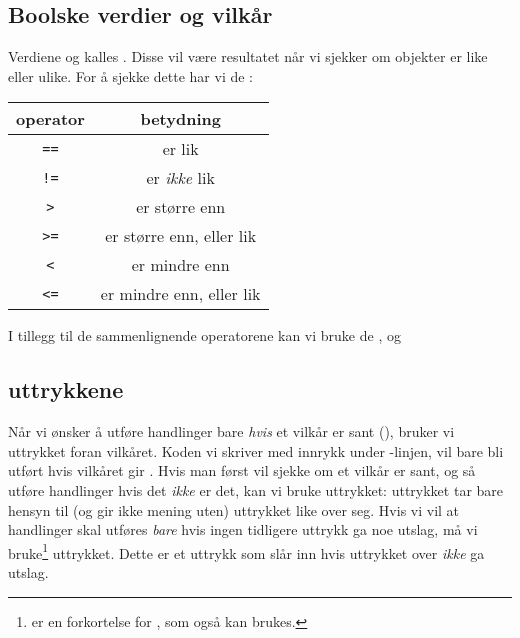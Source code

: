 \subsection{Boolske verdier og vilkår}
Verdiene  og  kalles . Disse vil være resultatet når vi sjekker om objekter er like eller ulike. For å sjekke dette har vi de :
\begin{center}
	\begin{tabular}{c|c}
		\textbf{operator} & \textbf{betydning} \\ \hline
		\texttt{==}	& er lik \\ \rowcolor{gray!10}
		\texttt{!=} & er \textsl{ikke} lik\\
		\texttt{>} & er større enn \\ \rowcolor{gray!10}
		\texttt{>=} & er større enn, eller lik \\
		\texttt{<} & er mindre enn \\ \rowcolor{gray!10}
		\texttt{<=} & er mindre enn, eller lik \\		
	\end{tabular}
\end{center}
\vsk

I tillegg til de sammenlignende operatorene kan vi bruke de  ,  og 
\subsection{ uttrykkene}
Når vi ønsker å utføre handlinger bare \textsl{hvis} et vilkår er sant (), bruker vi  uttrykket foran vilkåret. Koden vi skriver med innrykk under -linjen, vil bare bli utført hvis vilkåret gir . 
Hvis man først vil sjekke om et vilkår er sant, og så utføre handlinger hvis det \textsl{ikke} er det, kan vi bruke  uttrykket:
 uttrykket tar bare hensyn til (og gir ikke mening uten)  uttrykket like over seg. Hvis vi vil at handlinger skal utføres \textsl{bare} hvis ingen tidligere  uttrykk ga noe utslag, må vi bruke\footnote{ er en forkortelse for , som også kan brukes.}  uttrykket. Dette er et  uttrykk som slår inn hvis  uttrykket over \textsl{ikke} ga utslag.
\newpage
